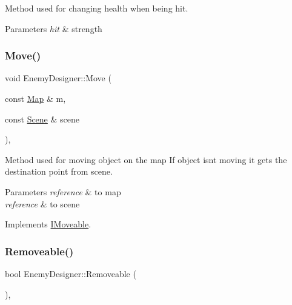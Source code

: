 Method used for changing health when being hit. 


\begin{DoxyParams}{Parameters}
{\em hit} & strength \\
\hline
\end{DoxyParams}
\mbox{\label{class_enemy_designer_a0aa9fb702dc95ad548108379ba3540a8}} 
\subsubsection{\texorpdfstring{Move()}{Move()}}
{\footnotesize\ttfamily void Enemy\+Designer\+::\+Move (\begin{DoxyParamCaption}\item[{const \mbox{\hyperlink{class_map}{Map}} \&}]{m,  }\item[{const \mbox{\hyperlink{class_scene}{Scene}} \&}]{scene }\end{DoxyParamCaption})\hspace{0.3cm}{\ttfamily [override]}, {\ttfamily [virtual]}}



Method used for moving object on the map If object isn\textquotesingle{}t moving it gets the destination point from scene. 


\begin{DoxyParams}{Parameters}
{\em reference} & to map \\
\hline
{\em reference} & to scene \\
\hline
\end{DoxyParams}


Implements \mbox{\hyperlink{class_i_moveable}{I\+Moveable}}.

\mbox{\label{class_enemy_designer_a721c45f9d14c10f55b2d7ae624e2db6a}} 
\subsubsection{\texorpdfstring{Removeable()}{Removeable()}}
{\footnotesize\ttfamily bool Enemy\+Designer\+::\+Removeable (\begin{DoxyParamCaption}{ }\end{DoxyParamCaption})\hspace{0.3cm}{\ttfamily [override]}, {\ttfamily [virtual]}}



